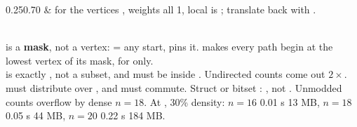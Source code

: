 {\begin{ctab}{0.25}{0.70}
 &  for the vertices , weights all 1, local
 is ; translate back with .\\
\end{ctab}\\[0.3ex]
 is a \textbf{mask}, not a vertex:  = any start,  pins
it.  makes every path begin at the lowest vertex of its mask, for
 only.\\[0.3ex]
 is exactly , not a subset, and  must be inside
. Undirected counts come out $2\times$.  must distribute over
, and  must commute. Struct or bitset :
, not . Unmodded counts overflow  by
dense $n = 18$. At , 30\% density: $n{=}16$ 0.01 s 13 MB, $n{=}18$ 0.05 s
44 MB, $n{=}20$ 0.22 s 184 MB.}


